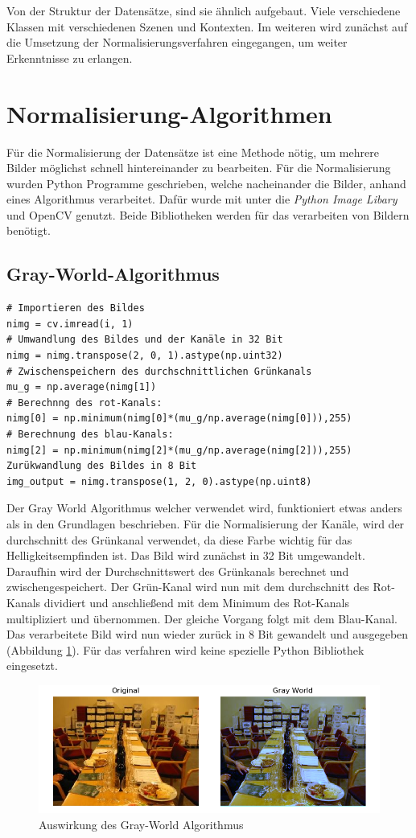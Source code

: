 Von der Struktur der Datensätze, sind sie ähnlich aufgebaut. Viele verschiedene Klassen mit verschiedenen Szenen und Kontexten. Im weiteren wird zunächst auf die Umsetzung der Normalisierungsverfahren eingegangen, um weiter Erkenntnisse zu erlangen.
\section{Normalisierung-Algorithmen}\label{s.nalgorithmen}
Für die Normalisierung der Datensätze ist eine Methode nötig, um mehrere Bilder möglichst schnell hintereinander zu bearbeiten. Für die Normalisierung wurden Python Programme geschrieben, welche nacheinander die Bilder, anhand eines Algorithmus verarbeitet. Dafür wurde mit unter die \textit{Python Image Libary} und OpenCV genutzt. Beide Bibliotheken werden für das verarbeiten von Bildern benötigt. 
\subsection{Gray-World-Algorithmus}
\begin{lstlisting}
# Importieren des Bildes
nimg = cv.imread(i, 1)
# Umwandlung des Bildes und der Kanäle in 32 Bit
nimg = nimg.transpose(2, 0, 1).astype(np.uint32)
# Zwischenspeichern des durchschnittlichen Grünkanals
mu_g = np.average(nimg[1])
# Berechnng des rot-Kanals: 
nimg[0] = np.minimum(nimg[0]*(mu_g/np.average(nimg[0])),255)
# Berechnung des blau-Kanals:
nimg[2] = np.minimum(nimg[2]*(mu_g/np.average(nimg[2])),255)
Zurükwandlung des Bildes in 8 Bit
img_output = nimg.transpose(1, 2, 0).astype(np.uint8)
\end{lstlisting}
Der Gray World Algorithmus \cite{gray2012world} welcher verwendet wird, funktioniert etwas anders als in den Grundlagen beschrieben. Für die Normalisierung der Kanäle, wird der durchschnitt des Grünkanal verwendet, da diese Farbe wichtig für das Helligkeitsempfinden ist. Das Bild wird zunächst in 32 Bit umgewandelt. Daraufhin wird  der Durchschnittswert des Grünkanals berechnet und zwischengespeichert. Der Grün-Kanal wird nun mit dem durchschnitt des Rot-Kanals dividiert und anschließend mit dem Minimum des Rot-Kanals multipliziert und übernommen. Der gleiche Vorgang folgt mit dem Blau-Kanal. Das verarbeitete Bild wird nun wieder zurück in 8 Bit gewandelt und ausgegeben (Abbildung \ref{img:gwnimg}). Für das verfahren wird keine spezielle Python Bibliothek eingesetzt.
\begin{figure}
	[h]
	\centering
	\includegraphics[scale=0.6]{Sources/gwn.png}
	\caption{Auswirkung des Gray-World Algorithmus}
	\label{img:gwnimg}
\end{figure}

